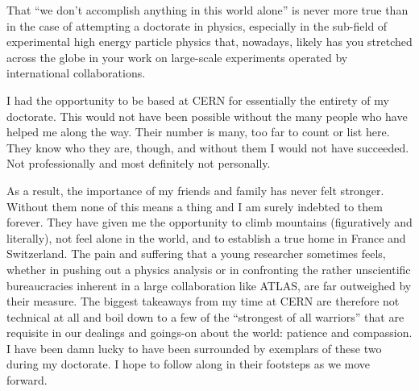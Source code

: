 That ``we don't accomplish anything in this world alone'' is never more true than in the
case of attempting a doctorate in physics, especially in the sub-field of experimental
high energy particle physics that, nowadays, likely has you stretched across the globe
in your work on large-scale experiments operated by international collaborations.

I had the opportunity to be based at CERN for essentially the entirety of my doctorate.
This would not have been possible without the many people who have helped me along the way.
Their number is many, too far to count or list here.
They know who they are, though, and without them I would not have succeeded.
Not professionally and most definitely not personally.

As a result, the importance of my friends and family has never felt stronger.
Without them none of this means a thing and I am surely indebted to them forever.
They have given me the opportunity to climb mountains (figuratively and literally), not feel alone in the world,
and to establish a true home in France and Switzerland.
The pain and suffering that a young researcher sometimes feels, whether in pushing out a physics analysis or in confronting the
rather unscientific bureaucracies inherent in a large collaboration like ATLAS, are far outweighed by their measure.
The biggest takeaways from my time at CERN are therefore not technical at all and boil down to
a few of the ``strongest of all warriors'' that are requisite in our dealings and goings-on about
the world: patience and compassion.
I have been damn lucky to have been surrounded by exemplars of these two during my doctorate.
I hope to follow along in their footsteps as we move forward.
